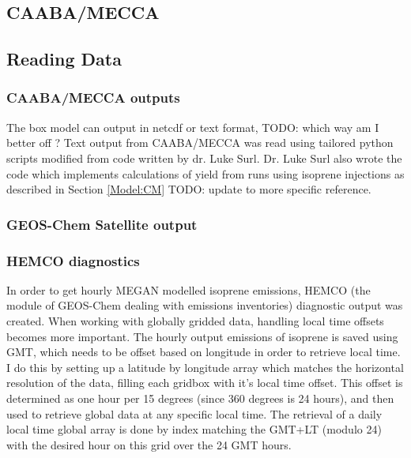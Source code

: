   \subsection{CAABA/MECCA}
  
  \subsection{Reading Data}
    \subsubsection{CAABA/MECCA outputs}
      The box model can output in netcdf or text format, TODO: which way am I better off ? 
      Text output from CAABA/MECCA was read using tailored python scripts modified from code written by dr. Luke Surl.
      Dr. Luke Surl also wrote the code which implements calculations of yield from runs using isoprene injections as described in Section \ref{Model:CM} TODO: update to more specific reference.
      
    \subsubsection{GEOS-Chem Satellite output}
    
    \subsubsection{HEMCO diagnostics}
      
      In order to get hourly MEGAN modelled isoprene emissions, HEMCO (the module of GEOS-Chem dealing with emissions inventories) diagnostic output was created.
      When working with globally gridded data, handling local time offsets becomes more important.
      The hourly output emissions of isoprene is saved using GMT, which needs to be offset based on longitude in order to retrieve local time.
      I do this by setting up a latitude by longitude array which matches the horizontal resolution of the data, filling each gridbox with it's local time offset.
      This offset is determined as one hour per 15 degrees (since 360 degrees is 24 hours), and then used to retrieve global data at any specific local time.
      The retrieval of a daily local time global array is done by index matching the GMT+LT (modulo 24) with the desired hour on this grid over the 24 GMT hours.
    
